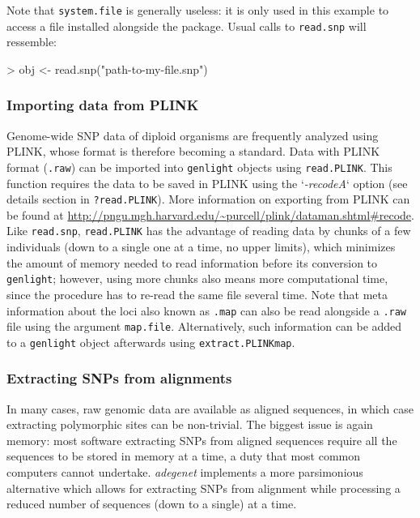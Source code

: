 \documentclass{article}
\begin{document}
Note that \texttt{system.file} is generally useless: it is only used in this example to access a
file installed alongside the package. Usual calls to \texttt{read.snp} will ressemble:
\begin{Schunk}
\begin{Sinput}
> obj <- read.snp("path-to-my-file.snp")
\end{Sinput}
\end{Schunk}


\subsubsection{Importing data from PLINK}

Genome-wide SNP data of diploid organisms are frequently analyzed using PLINK, whose format is
therefore becoming a standard.
Data with PLINK format (\texttt{.raw}) can be imported into \texttt{genlight} objects using \texttt{read.PLINK}.
This function requires the data to be saved in PLINK using the `\textit{-recodeA}` option (see details
section in \texttt{?read.PLINK}).
More information on exporting from PLINK can be found at \url{http://pngu.mgh.harvard.edu/~purcell/plink/dataman.shtml#recode}.
\\


Like \texttt{read.snp}, \texttt{read.PLINK} has the advantage of reading data by chunks of a few individuals
(down to a single one at a time, no upper limits), which minimizes the amount of memory needed to read information
before its conversion to \texttt{genlight}; however, using more chunks also means more computational
time, since the procedure has to re-read the same file several time.
Note that meta information about the loci also known as \texttt{.map} can also be read alongside a
\texttt{.raw} file using the argument \texttt{map.file}.
Alternatively, such information can be added to a \texttt{genlight} object afterwards using \texttt{extract.PLINKmap}.





\subsubsection{Extracting SNPs from alignments}
In many cases, raw genomic data are available as aligned sequences, in which case extracting
polymorphic sites can be non-trivial.
The biggest issue is again memory: most software extracting SNPs from aligned sequences
require all the sequences to be stored in memory at a time, a duty that most common computers cannot undertake.
\textit{adegenet} implements a more parsimonious alternative which allows for extracting SNPs from
alignment while processing a reduced number of sequences (down to a single) at a time.
\\
\end{document}
